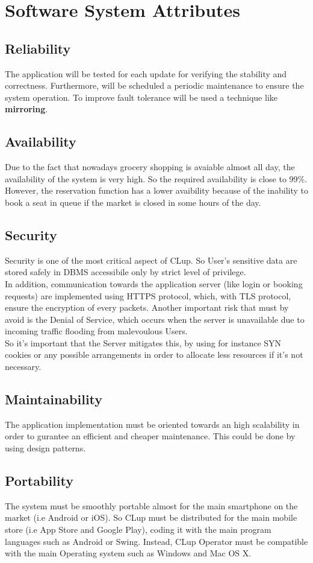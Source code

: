 \pagebreak

\section{Software System Attributes}
\subsection{Reliability}
The application will be tested for each update for verifying the stability and correctness.
Furthermore, will be scheduled a periodic maintenance to ensure the system operation.
To improve fault tolerance will be used a technique like \textbf{mirroring}.
 

\subsection{Availability}
Due to the fact that nowadays grocery shopping is avaiable almost all day, the availability of the system is very high. So the required availability is close to 99\%. \\
However, the reservation function has a lower avaibility because of the inability to book a seat in queue if the market is closed in some hours of the day. 
\subsection{Security}
Security is one of the most critical aspect of CLup. So User's sensitive data are stored safely in DBMS accessibile only by strict level of privilege.\\ 
In addition, communication towards the application server (like login or booking requests) are implemented using  HTTPS protocol, which, with TLS protocol, ensure the encryption of every packets. Another important risk that must by avoid is the Denial of Service, which occurs when the server is unavailable due to incoming traffic flooding from malevoulous Users.\\
So it's important that the Server mitigates this, by using for instance SYN cookies or any possible arrangements in order to allocate less resources if it's not necessary.
\subsection{Maintainability}
The application implementation must be oriented towards an high scalability in order to gurantee an efficient and cheaper maintenance. This could be done by using design patterns.
\subsection{Portability}
The system must be smoothly portable almost for the main smartphone on the market (i.e Android or iOS). So CLup must be distributed for the main mobile store (i.e App Store and Google Play), coding it with the main program languages such as Android or Swing. Instead, CLup Operator
must be compatible with the main Operating system such as Windows and Mac OS X. 